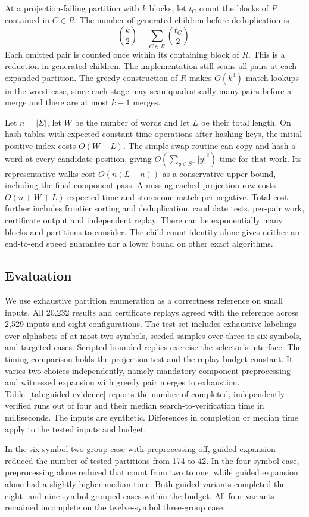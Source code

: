 At a projection-failing partition with \(k\) blocks, let \(t_C\) count
the blocks of \(P\) contained in \(C\in R\). The number of generated
children before deduplication is
\[
  \binom{k}{2}-\sum_{C\in R}\binom{t_C}{2}.
\]
Each omitted pair is counted once within its containing block of \(R\).
This is a reduction in generated children. The implementation still
scans all pairs at each expanded partition. The greedy construction of
\(R\) makes \(O(k^3)\) match lookups in the worst case, since each stage
may scan quadratically many pairs before a merge and there are at most
\(k-1\) merges.

Let \(n=|\Sigma|\), let \(W\) be the number of words and let \(L\) be
their total length. On hash tables with expected constant-time operations
after hashing keys, the initial positive index costs \(O(W+L)\).
The simple swap routine can copy and hash a word at every candidate
position, giving \(O(\sum_{y\in S^-}|y|^2)\) time for that work.
Its representative walks cost \(O(n(L+n))\) as a conservative upper
bound, including the final component pass. A missing cached projection
row costs \(O(n+W+L)\) expected time and stores one match per negative.
Total cost further includes frontier sorting and deduplication,
candidate tests, per-pair work, certificate output and independent
replay. There can be exponentially many blocks and partitions to
consider. The child-count identity alone gives neither an end-to-end
speed guarantee nor a lower bound on other exact algorithms.

\subsection{Evaluation}

We use exhaustive partition enumeration as a correctness reference on
small inputs. All 20,232 results and certificate replays agreed with
the reference across 2,529 inputs and eight configurations. The test
set includes exhaustive labelings over alphabets of at most two
symbols, seeded samples over three to six symbols, and targeted cases.
Scripted bounded replies exercise the selector's interface.
The timing comparison holds the projection test and the
replay budget constant. It varies two choices independently, namely
mandatory-component preprocessing and witnessed expansion with greedy
pair merges to exhaustion. Table~\ref{tab:guided-evidence} reports the
number of completed, independently verified runs out of four and
their median search-to-verification time in milliseconds. The inputs
are synthetic. Differences in completion or median time apply to
the tested inputs and budget.




In the six-symbol two-group case with preprocessing off, guided
expansion reduced the number of tested partitions from 174 to 42.
In the four-symbol case, preprocessing alone reduced that count from
two to one, while guided expansion alone had a slightly higher median
time. Both guided variants completed the eight- and nine-symbol
grouped cases within the budget. All four variants remained incomplete
on the twelve-symbol three-group case.
